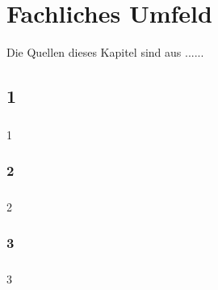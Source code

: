 \chapter{Fachliches Umfeld}\label{chp:fachlichesumfeld}
Die Quellen dieses Kapitel sind aus ......

\section{1}
\paragraph{}
1
\subsection{2}
\paragraph{}
2

\subsection{3}
\paragraph{}
3
